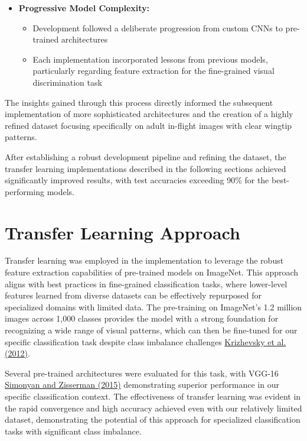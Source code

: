 \documentclass[a4paper,12pt]{report}
\begin{document}
\begin{itemize}
    \item \textbf{Progressive Model Complexity:}
    \begin{itemize}
        \item Development followed a deliberate progression from custom CNNs to pre-trained architectures
        \item Each implementation incorporated lessons from previous models, particularly regarding feature extraction for the fine-grained visual discrimination task
    \end{itemize}
\end{itemize}

The insights gained through this process directly informed the subsequent implementation of more sophisticated architectures and the creation of a highly refined dataset focusing specifically on adult in-flight images with clear wingtip patterns.

After establishing a robust development pipeline and refining the dataset, the transfer learning implementations described in the following sections achieved significantly improved results, with test accuracies exceeding 90\% for the best-performing models.


\section{Transfer Learning Approach}

Transfer learning was employed in the implementation to leverage the robust feature extraction capabilities of pre-trained models on ImageNet. This approach aligns with best practices in fine-grained classification tasks, where lower-level features learned from diverse datasets can be effectively repurposed for specialized domains with limited data. The pre-training on ImageNet's 1.2 million images across 1,000 classes provides the model with a strong foundation for recognizing a wide range of visual patterns, which can then be fine-tuned for our specific classification task despite class imbalance challenges \href{https://proceedings.neurips.cc/paper/2012/file/c399862d3b9d6b76c8436e924a68c45b-Paper.pdf}{Krizhevsky et al. (2012)}.

Several pre-trained architectures were evaluated for this task, with VGG-16 \href{https://arxiv.org/abs/1409.1556}{Simonyan and Zisserman (2015)} demonstrating superior performance in our specific classification context. The effectiveness of transfer learning was evident in the rapid convergence and high accuracy achieved even with our relatively limited dataset, demonstrating the potential of this approach for specialized classification tasks with significant class imbalance.
\end{document}
